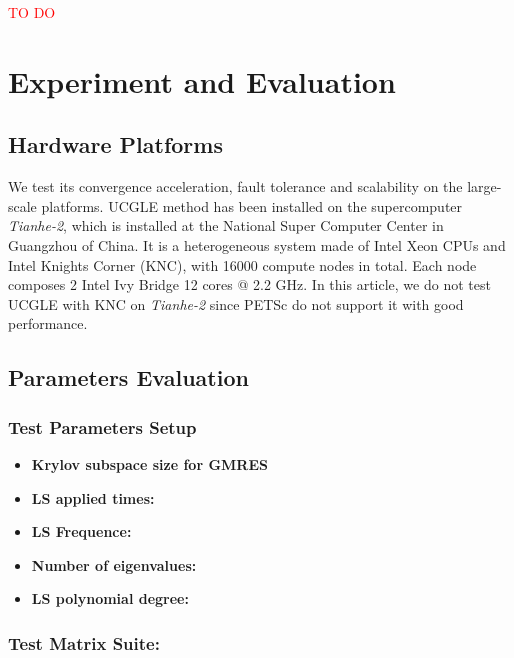 \textcolor{red}{TO DO}

\section{Experiment and Evaluation}

\subsection{Hardware Platforms}

We test its convergence acceleration, fault tolerance and scalability on the large-scale platforms. UCGLE method has been installed on the supercomputer \textit{Tianhe-2}, which is installed at the National Super Computer Center in Guangzhou of China. It is a heterogeneous system made of Intel Xeon CPUs and Intel Knights Corner (KNC), with 16000 compute nodes in total. Each node composes 2 Intel Ivy Bridge 12 cores @ 2.2 GHz. In this article, we do not test UCGLE with KNC on \textit{Tianhe-2} since PETSc do not support it with good performance.

\subsection{Parameters Evaluation}

\subsubsection{Test Parameters Setup}

\begin{itemize}
	\item \textbf{Krylov subspace size for GMRES }
	\item \textbf{LS applied times: }
	\item \textbf{LS Frequence:}
\end{itemize}

\begin{itemize}
	\item \textbf{Number of eigenvalues: }
\end{itemize}

\begin{itemize}
	\item \textbf{LS polynomial degree: }
\end{itemize}

\subsubsection{Test Matrix Suite: }

